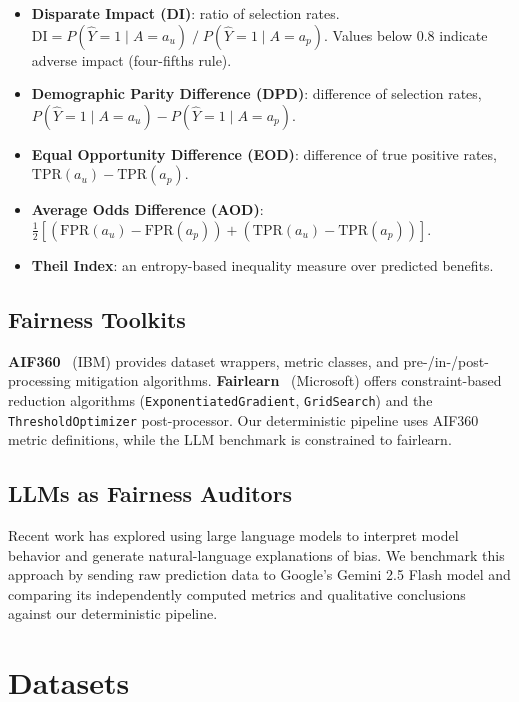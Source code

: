 \documentclass[11pt,a4paper]{article}
\begin{document}
\begin{itemize}[nosep]
  \item \textbf{Disparate Impact (DI)}: ratio of selection rates.
        $\text{DI} = P(\hat{Y}{=}1 \mid A{=}a_u)\;/\;P(\hat{Y}{=}1 \mid A{=}a_p)$.
        Values below 0.8 indicate adverse impact (four-fifths rule).
  \item \textbf{Demographic Parity Difference (DPD)}: difference of selection
        rates, $P(\hat{Y}{=}1 \mid A{=}a_u) - P(\hat{Y}{=}1 \mid A{=}a_p)$.
  \item \textbf{Equal Opportunity Difference (EOD)}: difference of true
        positive rates,
        $\text{TPR}(a_u) - \text{TPR}(a_p)$.
  \item \textbf{Average Odds Difference (AOD)}:
        $\frac{1}{2}[(\text{FPR}(a_u){-}\text{FPR}(a_p)) +
        (\text{TPR}(a_u){-}\text{TPR}(a_p))]$.
  \item \textbf{Theil Index}: an entropy-based inequality measure over
        predicted benefits.
\end{itemize}

\subsection{Fairness Toolkits}

\textbf{AIF360}~\cite{aif360} (IBM) provides dataset wrappers, metric
classes, and pre-/in-/post-processing mitigation algorithms.
\textbf{Fairlearn}~\cite{fairlearn} (Microsoft) offers constraint-based
reduction algorithms (\texttt{ExponentiatedGradient}, \texttt{GridSearch})
and the \texttt{ThresholdOptimizer} post-processor. Our deterministic
pipeline uses AIF360 metric definitions, while the LLM benchmark is
constrained to fairlearn.

\subsection{LLMs as Fairness Auditors}

Recent work has explored using large language models to interpret model
behavior and generate natural-language explanations of bias. We benchmark
this approach by sending raw prediction data to Google's Gemini 2.5 Flash
model and comparing its independently computed metrics and qualitative
conclusions against our deterministic pipeline.

\section{Datasets}
\end{document}
